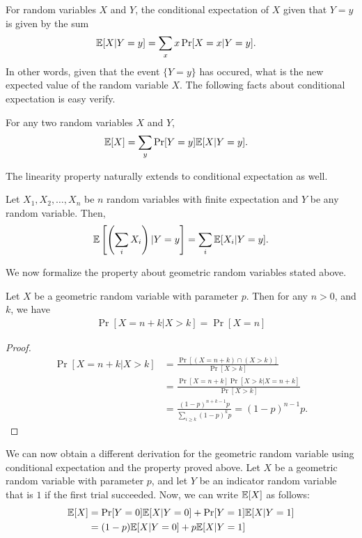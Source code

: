 For random variables $X$ and $Y$, the conditional expectation of $X$ given that $Y=y$ is given by the sum
\begin{align*}
	\mathbb{E}[X|Y=y] &= \sum_{x} x \Pr[X=x|Y=y].
\end{align*}
In other words, given that the event $\{Y=y\}$ has occured, what is the new expected value of the random variable $X$. The following facts about conditional expectation is easy verify.
\begin{fact}
	For any two random variables $X$ and $Y$, 
	\begin{align*}
		\mathbb{E}[X] &= \sum_{y} \Pr[Y=y] \mathbb{E}[X|Y=y].
	\end{align*}
\end{fact}

The linearity property naturally extends to conditional expectation as well.
\begin{fact}
	Let $X_1, X_2, \ldots, X_n$ be $n$ random variables with finite expectation  and $Y$ be any random variable. Then,
	\begin{align*}
		\mathbb{E}\left[ \left(\sum_i X_i\right) | Y=y \right] = \sum_i \mathbb{E}[X_i | Y=y]. 
	\end{align*}
\end{fact}

We now formalize the property about geometric random variables stated above.
\begin{theorem}
	Let $X$ be a geometric random variable with parameter $p$. Then for any $n>0$, and $k$, we have
	\begin{align*}
		\Pr[X = n+k | X > k] = \Pr[X=n]
	\end{align*}
	\label{thm:geom-mem}
\end{theorem}
\begin{proof}
	\begin{align*}
		\Pr[X = n+k | X > k] &= \frac{\Pr[(X=n+k) \cap (X>k)]}{\Pr[X>k]}\\
		&= \frac{\Pr[X=n+k]\Pr[X>k | X=n+k]}{\Pr[X>k]}\\
		&= \frac{(1-p)^{n+k-1}p}{\sum_{i\geq k}(1-p)^kp} = (1-p)^{n-1}p.
	\end{align*}
\end{proof}

We can now obtain a different derivation for the geometric random variable using conditional expectation and the property proved above. Let $X$ be a geometric random variable with parameter $p$, and let $Y$ be an indicator random variable that is $1$ if the first trial succeeded. Now, we can write $\mathbb{E}[X]$ as follows:
\begin{align*}
	\mathbb{E}[X] &= \Pr[Y=0]\mathbb{E}[X|Y=0] + \Pr[Y=1]\mathbb{E}[X|Y=1]\\
	&= (1-p)\mathbb{E}[X|Y=0] + p\mathbb{E}[X|Y=1]
\end{align*}

